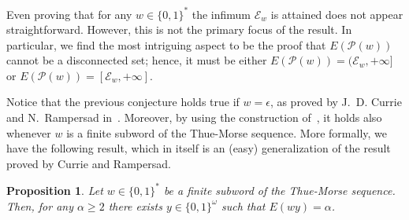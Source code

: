 \documentclass[12pt]{article}
\theoremstyle{plain}\newtheorem{teo}{Theorem}
\theoremstyle{plain}\newtheorem{proposition}[teo]{Proposition}
\theoremstyle{plain}\newtheorem{lemma}[teo]{Lemma}
\theoremstyle{plain}\newtheorem{corollary}[teo]{Corollary}
\theoremstyle{plain}\newtheorem{conjecture}[teo]{Conjecture}
\theoremstyle{definition}\newtheorem{definition}[teo]{Definition}
\theoremstyle{remark}\newtheorem{remark}[teo]{Remark}
\theoremstyle{definition}\newtheorem{example}[teo]{Example}
\numberwithin{teo}{section}
\numberwithin{equation}{section}
\begin{document}
Even proving that for any $w\in \{0,1\}^*$
the infimum $\mathcal{E}_w$ is attained
does not appear straightforward.
However, this is not the primary focus of the result.
In particular, we find the most intriguing aspect to be
the proof that $E(\mathcal{P}(w))$ cannot be a disconnected set;
hence, it must be either
$E(\mathcal{P}(w)) = (\mathcal{E}_w,+\infty]$
or $E(\mathcal{P}(w)) = [\mathcal{E}_w,+\infty]$.

Notice that the previous conjecture holds true
if $w = \epsilon$,
as proved by 
J.~D. Currie and N.~Rampersad
in~\cite{currie2008each}.
Moreover, by using the construction 
of~\cite{currie2008each},
it holds also whenever $w$ is a finite
subword of the Thue-Morse sequence.
More formally, we have the following result, which in itself is an (easy) generalization of the result proved by Currie and Rampersad.
\begin{proposition}
	\label{prop:w-subword-TM}
	Let $w\in\{0,1\}^*$ be a finite subword of the 
	Thue-Morse sequence.
	Then, for any $\alpha \ge 2$
	there exists $y \in \{0,1\}^\omega$
	such that $E(wy) = \alpha$.
\end{proposition}
\end{document}
